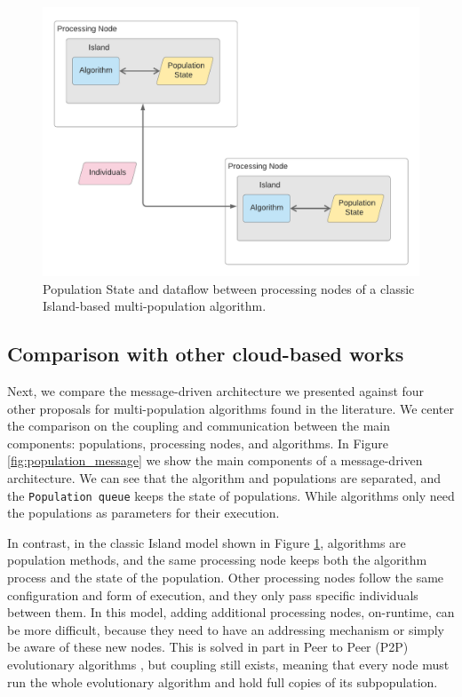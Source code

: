 \documentclass[review]{elsarticle}
\begin{document}
\begin{figure}[ht]
    \centering
    \includegraphics[width=\textwidth]{classicisland}
    \caption{ Population State and dataflow between processing nodes of a classic Island-based multi-population algorithm. }
    \label{fig:classicisland}
\end{figure}

\subsection{Comparison with other cloud-based works} 
\label{comparison}

Next, we compare the message-driven architecture we presented against four other
proposals for multi-population algorithms found in the literature. We center the
comparison on the coupling and communication between the main components:
populations, processing nodes, and algorithms.  In Figure \ref{fig:population_message} we show the
main components of a message-driven architecture. We can see that the algorithm
and populations are separated, and the \texttt{Population queue} keeps the state
of populations. While algorithms only need the populations as parameters
for their execution.


In contrast, in the classic Island model shown in Figure
\ref{fig:classicisland}, algorithms are  population methods, and the same processing
node keeps both the algorithm process and the state of the population.  Other
processing nodes follow the same configuration and form of execution, and they
only pass specific individuals between them.  In this model, adding additional
processing nodes, on-runtime, can be more difficult, because they need to have
an addressing mechanism or simply be aware of these new nodes. This is
solved in part in Peer to Peer (P2P) evolutionary algorithms
\cite{juanlu:europar}, but coupling still exists, meaning that every
node must run the whole evolutionary algorithm and hold full copies of
its subpopulation. 
\end{document}
